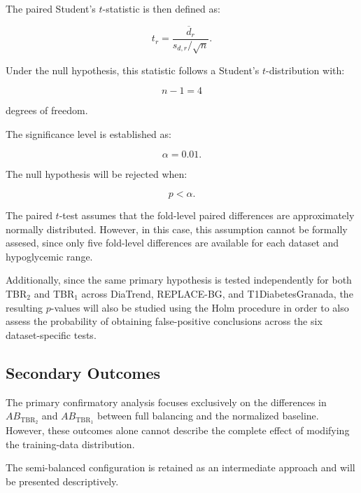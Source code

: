 The paired Student's \(t\)-statistic is then defined as:

\begin{equation}
t_r
=
\frac{
\overline{d}_r
}{
s_{d,r}/\sqrt{n}
}.
\label{eq:paired_t_statistic}
\end{equation}

Under the null hypothesis, this statistic follows a Student's \(t\)-distribution with:

\begin{equation}
n-1=4
\end{equation}

degrees of freedom.

The significance level is established as:

\begin{equation}
\alpha=0.01.
\end{equation}

The null hypothesis will be rejected when:

\begin{equation}
p<\alpha.
\end{equation}

The paired \(t\)-test assumes that the fold-level paired differences are approximately normally distributed. However, in this case, this assumption cannot be formally assesed, since only five fold-level differences are available for each dataset and hypoglycemic range.

Additionally, since the same primary hypothesis is tested independently for both TBR$_2$ and TBR$_1$ across DiaTrend, REPLACE-BG, and T1DiabetesGranada, the resulting \(p\)-values will also be studied using the Holm procedure \cite{enwiki:1352765388} in order to also assess the probability of obtaining false-positive conclusions across the six dataset-specific tests.

\subsection{Secondary Outcomes}
\label{subsec:secondary_statistical_outcomes}

The primary confirmatory analysis focuses exclusively on the differences in \(AB_{\mathrm{TBR_2}}\) and \(AB_{\mathrm{TBR_1}}\) between full balancing and the normalized baseline. However, these outcomes alone cannot describe the complete effect of modifying the training-data distribution.

The semi-balanced configuration is retained as an intermediate approach and will be presented descriptively.

